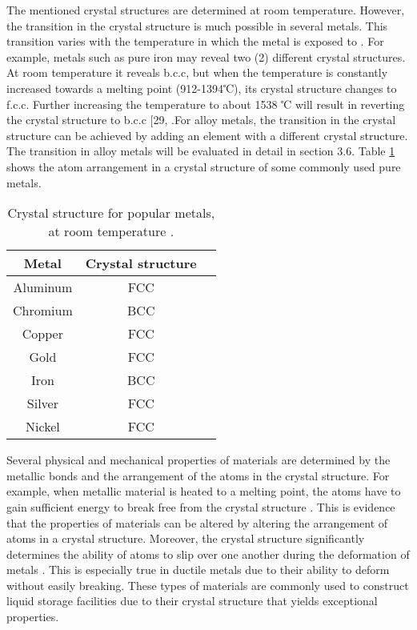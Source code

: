 The mentioned crystal structures are determined at room temperature.  However, the transition in the crystal structure is much possible in several metals. This transition varies with the temperature in which the metal is exposed to \cite{callister2018materials}. For example, metals such as pure iron may reveal two (2) different crystal structures. At room temperature it reveals b.c.c, but when the temperature is constantly increased towards a melting point (912-1394℃), its crystal structure changes to f.c.c. Further increasing the temperature to about 1538 ℃ will result in reverting the crystal structure to b.c.c [29, \cite{molabe2018determining}.For alloy metals, the transition in the crystal structure can be achieved by adding an element with a different crystal structure. The transition in alloy metals will be evaluated in detail in section 3.6. Table \ref{ch3:table:structure} shows the atom arrangement in a crystal structure of some commonly used pure metals.

\begin{table}[H]
\caption{Crystal structure for popular metals, at room temperature \cite{hench2005biomaterials}.}

\centering
\begin{tabular}{ c c c }
    \hline
    Metal & Crystal structure \\
    \hline
    Aluminum & FCC \\
    Chromium & BCC \\
    Copper & FCC \\
    Gold & FCC \\
    Iron & BCC \\
    Silver & FCC \\
    Nickel & FCC \\
    \hline
\end{tabular}

\label{ch3:table:structure}
\end{table}

Several physical and mechanical properties of materials are determined by the metallic bonds and the arrangement of the atoms in the crystal structure. For example, when metallic material is heated to a melting point, the atoms have to gain sufficient energy to break free from the crystal structure \cite{hench2005biomaterials}. This is evidence that the properties of materials can be altered by altering the arrangement of atoms in a crystal structure. Moreover, the crystal structure significantly determines the ability of atoms to slip over one another during the deformation of metals \cite{callister2018materials}. This is especially true in ductile metals due to their ability to deform without easily breaking. These types of materials are commonly used to construct liquid storage facilities due to their crystal structure that yields exceptional properties.

